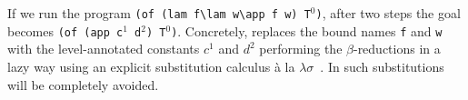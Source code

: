 \documentclass{llncs}
\begin{document}
If we run the program
\verb+(of (lam f\lam w\app f w) T+$^0$\verb+)+, after two steps the goal becomes
\verb+(of (app c+$^1$\verb+ d+$^2$\verb+) T+$^0$\verb+)+.
Concretely, \tedius{} replaces the bound names \verb+f+ and \verb+w+ with the level-annotated constants $c^1$ and $d^2$ performing the $\beta$-reductions
in a lazy way using an explicit substitution calculus
\`a la $\lambda\sigma$~\cite{DBLP:journals/jar/LiangNQ04}.
In \rff{} such substitutions will be completely avoided.

% 
% 
\end{document}
